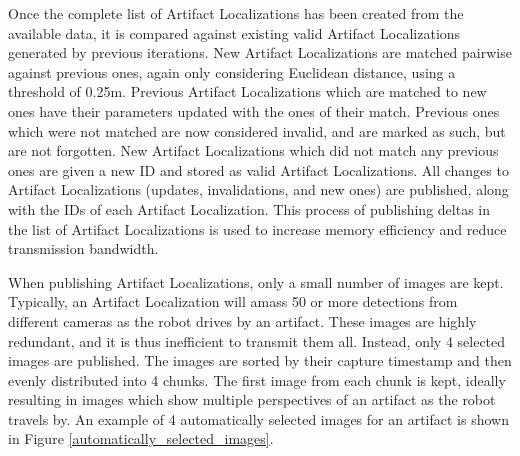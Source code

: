\begin{description}
	Once the complete list of Artifact Localizations has been created from the available data, it is compared against existing valid Artifact Localizations generated by previous iterations. New Artifact Localizations are matched pairwise against previous ones, again only considering Euclidean distance, using a threshold of 0.25m. Previous Artifact Localizations which are matched to new ones have their parameters updated with the ones of their match. Previous ones which were not matched are now considered invalid, and are marked as such, but are not forgotten. New Artifact Localizations which did not match any previous ones are given a new ID and stored as valid Artifact Localizations. All changes to Artifact Localizations (updates, invalidations, and new ones) are published, along with the IDs of each Artifact Localization. This process of publishing deltas in the list of Artifact Localizations is used to increase memory efficiency and reduce transmission bandwidth.
	
	When publishing Artifact Localizations, only a small number of images are kept. Typically, an Artifact Localization will amass 50 or more detections from different cameras as the robot drives by an artifact. These images are highly redundant, and it is thus inefficient to transmit them all. Instead, only 4 selected images are published. The images are sorted by their capture timestamp and then evenly distributed into 4 chunks. The first image from each chunk is kept, ideally resulting in images which show multiple perspectives of an artifact as the robot travels by. An example of 4 automatically selected images for an artifact is shown in Figure \ref{automatically_selected_images}.
\end{description}


